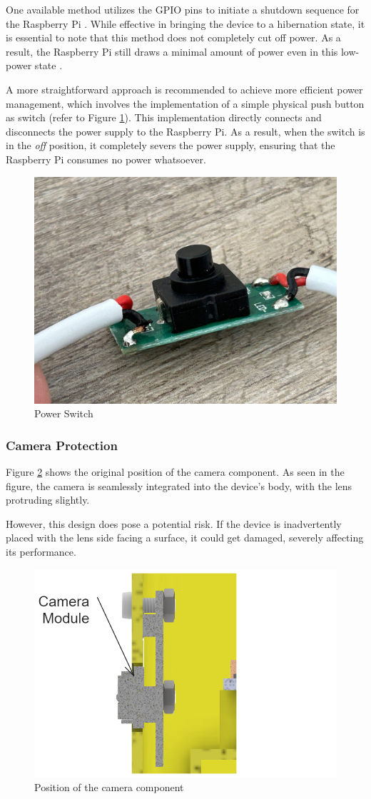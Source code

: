 One available method utilizes the GPIO pins to initiate a shutdown sequence for the Raspberry Pi \cite{Labidi21}. While effective in bringing the device to a hibernation state, it is essential to note that this method does not completely cut off power. As a result, the Raspberry Pi still draws a minimal amount of power even in this low-power state \cite{jdb}.

A more straightforward approach is recommended to achieve more efficient power management, which involves the implementation of a simple physical push button as switch (refer to Figure \ref{fig:power_switch}). This implementation directly connects and disconnects the power supply to the Raspberry Pi. As a result, when the switch is in the \textit{off} position, it completely severs the power supply, ensuring that the Raspberry Pi consumes no power whatsoever.

\begin{figure}[!ht]
    \centering
    \includegraphics[height=5 cm]{texs/Part1/chapter4/image/d00.jpg}
    \caption{Power Switch}
    \label{fig:power_switch}
\end{figure}

\subsubsection{Camera Protection}
Figure \ref{fig:camera_position} shows the original position of the camera component. As seen in the figure, the camera is seamlessly integrated into the device's body, with the lens protruding slightly.

However, this design does pose a potential risk. If the device is inadvertently placed with the lens side facing a surface, it could get damaged, severely affecting its performance.

\begin{figure}[!ht]
    \centering
    \includegraphics[height=5 cm]{texs/Part1/chapter4/image/d1.png}
    \caption{Position of the camera component}
    \label{fig:camera_position}
\end{figure}

